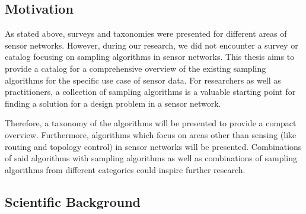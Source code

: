 \subsection{Motivation}
\label{sec:motivation}

As stated above, surveys and taxonomies were presented for different areas of
sensor networks. However, during our research, we did not encounter a survey or
catalog focusing on sampling algorithms in sensor networks. This thesis aims to
provide a catalog for a comprehensive overview of the existing sampling
algorithms for the specific use case of sensor data. For researchers as well as
practitioners, a collection of sampling algorithms is a valuable starting point
for finding a solution for a design problem in a sensor network. 
\par
Therefore, a taxonomy of the algorithms will be presented to provide a compact
overview. Furthermore, algorithms which focus on areas other than sensing (like
routing and topology control) in sensor networks will be presented.
Combinations of said algorithms with sampling algorithms as well as
combinations of sampling algorithms from different categories could inspire
further research.


\subsection{Scientific Background}
\label{sec:Scientific Background}

